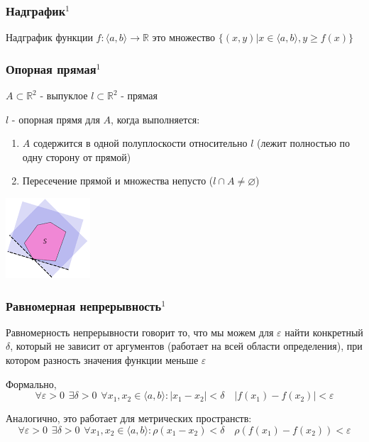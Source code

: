 \documentclass{article}
\begin{document}
\subsubsection{Надграфик\texorpdfstring{$^1$}{}}
Надграфик функции $f: \langle a, b \rangle \rightarrow \mathbb{R}$ это множество $\{(x, y)|x\in \langle a, b\rangle, y \ge f(x)\}$


\subsubsection{Опорная прямая\texorpdfstring{$^1$}{}}
$A \subset \mathbb{R}^2$ - выпуклое
$l \subset \mathbb{R}^2$ - прямая

$l$ - опорная прямя для $A$, когда выполняется:
\begin{enumerate}
    \item $A$ содержится в одной полуплоскости относительно $l$ (лежит полностью по одну сторону от прямой)
    \item Пересечение прямой и множества непусто ($l \cap A \ne \varnothing$)
\end{enumerate}
\includegraphics{baseline}


\subsubsection{Равномерная непрерывность\texorpdfstring{$^1$}{}}
Равномерность непрерывности говорит то, что мы можем для $\varepsilon$ найти конкретный $\delta$, который не зависит от аргументов (работает на всей области определения), при котором разность значения функции меньше $\varepsilon$

Формально, 
$$
\forall \varepsilon > 0 \hspace{5pt} \exists \delta > 0 \hspace{5pt} \forall x_1, x_2 \in \langle a, b \rangle : |x_1 - x_2| < \delta \quad |f(x_1) - f(x_2)| < \varepsilon 
$$

Аналогично, это работает для метрических пространств:
$$
\forall \varepsilon > 0 \hspace{5pt} \exists \delta > 0 \hspace{5pt} \forall x_1, x_2 \in \langle a, b \rangle : \rho(x_1 - x_2) < \delta \quad \rho(f(x_1) - f(x_2)) < \varepsilon 
$$
\end{document}
